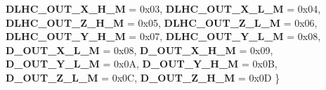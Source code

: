 \begin{DoxyCompactItemize}
{\bfseries D\+L\+H\+C\+\_\+\+O\+U\+T\+\_\+\+X\+\_\+\+H\+\_\+M} = 0x03, 
\newline
{\bfseries D\+L\+H\+C\+\_\+\+O\+U\+T\+\_\+\+X\+\_\+\+L\+\_\+M} = 0x04, 
{\bfseries D\+L\+H\+C\+\_\+\+O\+U\+T\+\_\+\+Z\+\_\+\+H\+\_\+M} = 0x05, 
{\bfseries D\+L\+H\+C\+\_\+\+O\+U\+T\+\_\+\+Z\+\_\+\+L\+\_\+M} = 0x06, 
{\bfseries D\+L\+H\+C\+\_\+\+O\+U\+T\+\_\+\+Y\+\_\+\+H\+\_\+M} = 0x07, 
\newline
{\bfseries D\+L\+H\+C\+\_\+\+O\+U\+T\+\_\+\+Y\+\_\+\+L\+\_\+M} = 0x08, 
{\bfseries D\+\_\+\+O\+U\+T\+\_\+\+X\+\_\+\+L\+\_\+M} = 0x08, 
{\bfseries D\+\_\+\+O\+U\+T\+\_\+\+X\+\_\+\+H\+\_\+M} = 0x09, 
{\bfseries D\+\_\+\+O\+U\+T\+\_\+\+Y\+\_\+\+L\+\_\+M} = 0x0A, 
\newline
{\bfseries D\+\_\+\+O\+U\+T\+\_\+\+Y\+\_\+\+H\+\_\+M} = 0x0B, 
{\bfseries D\+\_\+\+O\+U\+T\+\_\+\+Z\+\_\+\+L\+\_\+M} = 0x0C, 
{\bfseries D\+\_\+\+O\+U\+T\+\_\+\+Z\+\_\+\+H\+\_\+M} = 0x0D
 \}
\end{DoxyCompactItemize}

